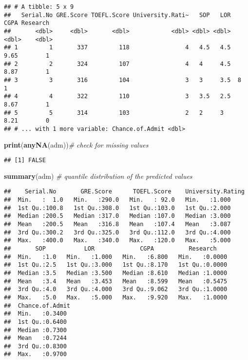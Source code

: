\documentclass[11pt,]{article}
\newenvironment{Shaded}{\begin{snugshade}}{\end{snugshade}}
\newcommand{\CommentTok}[1]{\textcolor[rgb]{0.56,0.35,0.01}{\textit{#1}}}
\newcommand{\KeywordTok}[1]{\textcolor[rgb]{0.13,0.29,0.53}{\textbf{#1}}}
\newcommand{\NormalTok}[1]{#1}
\begin{document}
\begin{verbatim}
## # A tibble: 5 x 9
##   Serial.No GRE.Score TOEFL.Score University.Rati~   SOP   LOR  CGPA Research
##       <dbl>     <dbl>       <dbl>            <dbl> <dbl> <dbl> <dbl>    <dbl>
## 1         1       337         118                4   4.5   4.5  9.65        1
## 2         2       324         107                4   4     4.5  8.87        1
## 3         3       316         104                3   3     3.5  8           1
## 4         4       322         110                3   3.5   2.5  8.67        1
## 5         5       314         103                2   2     3    8.21        0
## # ... with 1 more variable: Chance.of.Admit <dbl>
\end{verbatim}

\begin{Shaded}
\begin{Highlighting}[]
\KeywordTok{print}\NormalTok{(}\KeywordTok{anyNA}\NormalTok{(adm))}\CommentTok{# check for missing values}
\end{Highlighting}
\end{Shaded}

\begin{verbatim}
## [1] FALSE
\end{verbatim}

\begin{Shaded}
\begin{Highlighting}[]
\KeywordTok{summary}\NormalTok{(adm) }\CommentTok{# quantile distribution of the predicted values}
\end{Highlighting}
\end{Shaded}

\begin{verbatim}
##    Serial.No       GRE.Score      TOEFL.Score    University.Rating
##  Min.   :  1.0   Min.   :290.0   Min.   : 92.0   Min.   :1.000    
##  1st Qu.:100.8   1st Qu.:308.0   1st Qu.:103.0   1st Qu.:2.000    
##  Median :200.5   Median :317.0   Median :107.0   Median :3.000    
##  Mean   :200.5   Mean   :316.8   Mean   :107.4   Mean   :3.087    
##  3rd Qu.:300.2   3rd Qu.:325.0   3rd Qu.:112.0   3rd Qu.:4.000    
##  Max.   :400.0   Max.   :340.0   Max.   :120.0   Max.   :5.000    
##       SOP           LOR             CGPA          Research     
##  Min.   :1.0   Min.   :1.000   Min.   :6.800   Min.   :0.0000  
##  1st Qu.:2.5   1st Qu.:3.000   1st Qu.:8.170   1st Qu.:0.0000  
##  Median :3.5   Median :3.500   Median :8.610   Median :1.0000  
##  Mean   :3.4   Mean   :3.453   Mean   :8.599   Mean   :0.5475  
##  3rd Qu.:4.0   3rd Qu.:4.000   3rd Qu.:9.062   3rd Qu.:1.0000  
##  Max.   :5.0   Max.   :5.000   Max.   :9.920   Max.   :1.0000  
##  Chance.of.Admit 
##  Min.   :0.3400  
##  1st Qu.:0.6400  
##  Median :0.7300  
##  Mean   :0.7244  
##  3rd Qu.:0.8300  
##  Max.   :0.9700
\end{verbatim}
\end{document}
